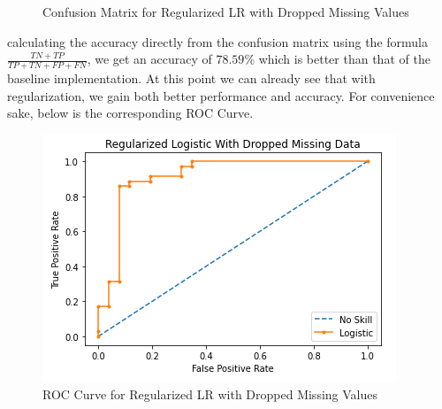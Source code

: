 \begin{itemize}
\begin{figure}[H]
\begin{center}
        \end{center}
        \caption{Confusion Matrix for Regularized LR with Dropped Missing Values}
    \end{figure}
    calculating the accuracy directly from the confusion matrix using the formula$\frac{TN + TP}{TP + TN + FP + FN}$, we get an accuracy of $78.59\%$ which is better than that of the baseline implementation. 
    At this point we can already see that with regularization, we gain both better performance and accuracy. For convenience sake, below is the corresponding ROC Curve.
    \begin{figure}[H]
        \begin{center}
            \includegraphics[scale=0.6]{Images/RD_ROC.png}
        \end{center}
        \caption{ROC Curve for Regularized LR with Dropped Missing Values}
    \end{figure}


\end{itemize}
